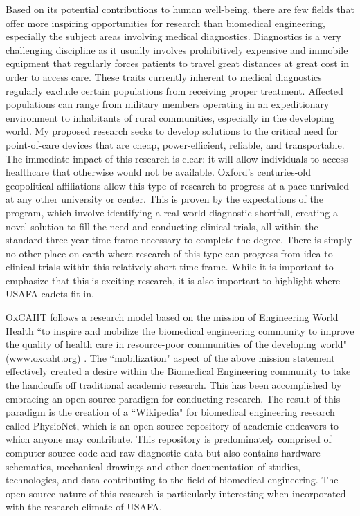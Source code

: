 \documentclass{article}
\begin{document}
Based on its potential contributions to human well-being, there are few fields
that offer more inspiring opportunities for research than biomedical engineering, especially the subject areas involving medical diagnostics.
Diagnostics is a very challenging discipline as it usually involves
prohibitively expensive and immobile equipment that regularly forces patients
to travel great distances at great cost in order to access care. These traits
currently inherent to medical diagnostics regularly exclude certain
populations from receiving proper
treatment. Affected populations can range from military members operating in an
expeditionary environment to inhabitants of rural communities, especially in the developing
world. My proposed research seeks to develop solutions to the critical need for
point-of-care devices that are cheap, power-efficient, reliable, and
transportable. The immediate impact of this research is clear: it will allow
individuals to access healthcare that otherwise would not be available. Oxford's
centuries-old geopolitical affiliations allow this type of research to progress 
at a pace unrivaled at any other university or center. This is proven by the
expectations of the program, which involve identifying a real-world diagnostic 
shortfall, creating a novel solution to fill the need and conducting
clinical trials, all within the standard three-year time frame necessary to 
complete the degree. There is simply no other place on earth where research of
this type can progress from idea to clinical trials within this relatively short
time frame. While it is important to emphasize that this is exciting research,
it is also important to highlight where USAFA cadets fit in.
 
OxCAHT follows a research model based on the mission of Engineering World
Health ``to inspire and mobilize the biomedical engineering community to improve
the quality of health care in resource-poor communities of the developing
world" (www.oxcaht.org) . The ``mobilization" aspect of the above mission
statement effectively created a desire within the Biomedical Engineering 
community to take the handcuffs off traditional academic research. This has
been accomplished by embracing an open-source paradigm for conducting research.
The result of this paradigm is the creation of a ``Wikipedia" for biomedical
engineering research called PhysioNet, which is an open-source repository of
academic endeavors to which anyone may contribute. This repository is
predominately comprised of computer source code and raw diagnostic data but
also contains hardware schematics, mechanical drawings and other documentation
of studies, technologies, and data contributing to the field of biomedical
engineering. The open-source nature of this research is particularly
interesting when incorporated with the research climate of USAFA.
 
\end{document}
